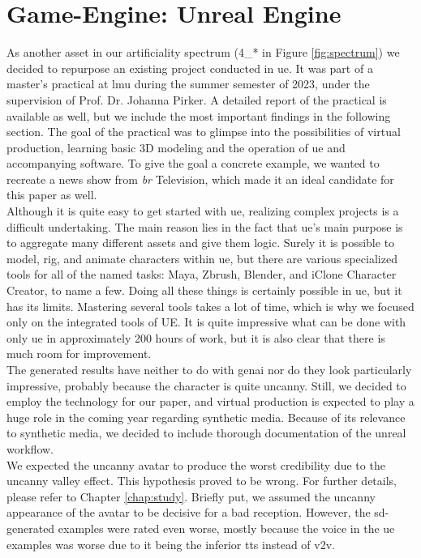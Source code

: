 \documentclass[
  a4paper,  %
  twoside,  %
  bibliography=totoc,
  headsepline,
  cleardoublepage=empty,
  parskip=half,
  draft=false
]{scrbook}
\begin{document}
\section{Game-Engine: Unreal Engine}
As another asset in our artificiality spectrum (4\_* in Figure \ref{fig:spectrum}) we decided to repurpose an existing project conducted in \gls{ue}. It was part of a master's practical at \gls{lmu} during the summer semester of 2023, under the supervision of Prof. Dr. Johanna Pirker. A detailed report of the practical is available as well, but we include the most important findings in the following section. The goal of the practical was to glimpse into the possibilities of virtual production, learning basic 3D modeling and the operation of \gls{ue} and accompanying software. To give the goal a concrete example, we wanted to recreate a news show from \textit{\gls{br}} Television, which made it an ideal candidate for this paper as well. \\
Although it is quite easy to get started with \gls{ue}, realizing complex projects is a difficult undertaking. The main reason lies in the fact that \gls{ue}'s main purpose is to aggregate many different assets and give them logic. Surely it is possible to model, rig, and animate characters within \gls{ue}, but there are various specialized tools for all of the named tasks: Maya, Zbrush, Blender, and iClone Character Creator, to name a few. Doing all these things is certainly possible in \gls{ue}, but it has its limits. Mastering several tools takes a lot of time, which is why we focused only on the integrated tools of UE. It is quite impressive what can be done with only \gls{ue} in approximately 200 hours of work, but it is also clear that there is much room for improvement. \\
The generated results have neither to do with \gls{genai} nor do they look particularly impressive, probably because the character is quite uncanny. Still, we decided to employ the technology for our paper, and virtual production is expected to play a huge role in the coming year regarding synthetic media. Because of its relevance to synthetic media, we decided to include thorough documentation of the unreal workflow. \\
We expected the uncanny avatar to produce the worst credibility due to the uncanny valley effect. This hypothesis proved to be wrong. For further details, please refer to Chapter \ref{chap:study}. Briefly put, we assumed the uncanny appearance of the avatar to be decisive for a bad reception. However, the \gls{sd}-generated examples were rated even worse, mostly because the voice in the \gls{ue} examples was worse due to it being the inferior \gls{tts} instead of \gls{v2v}.
\end{document}
